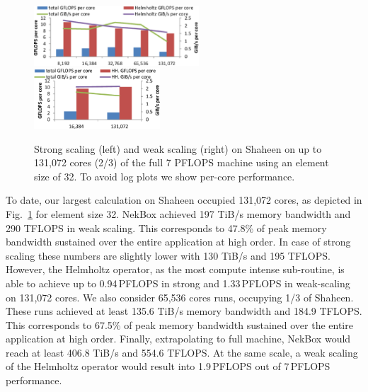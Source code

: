 \begin{figure}[!t]
\centering
\includegraphics[width=0.55\textwidth]{gfx/shaheen_strong}
~
\includegraphics[width=0.42\textwidth]{gfx/shaheen_weak}
\caption{Strong scaling (left) and weak scaling (right) on Shaheen on up to 131,072  cores (2/3) of the full 7 PFLOPS machine using 
an element size of 32.
To avoid log plots we show per-core performance.}
\label{fig:shaheen_scaling}
\end{figure}

To date, our largest calculation on Shaheen occupied 131,072 cores, as depicted in Fig.~\ref{fig:shaheen_scaling}
for element size 32.
NekBox achieved 197 TiB/s memory bandwidth and 290 TFLOPS in weak scaling.
This corresponds to 47.8\% of peak memory bandwidth sustained over the entire application at high order.
In case of strong scaling these numbers are slightly lower with 130 TiB/s and 195 TFLOPS. 
However, the Helmholtz operator, as the most compute intense sub-routine, is able to achieve
up to 0.94\,PFLOPS in strong and 1.33\,PFLOPS
 in weak-scaling on 131,072 cores. %
We also consider 65,536 cores runs, occupying 1/3 of Shaheen.
These runs achieved at least 135.6 TiB/s memory bandwidth and 184.9 TFLOPS.
This corresponds to 67.5\% of peak memory bandwidth sustained over the entire application at high order.
Finally, extrapolating to full machine, NekBox would reach at least 406.8 TiB/s and 554.6 TFLOPS. At the same scale,
a weak scaling of the Helmholtz operator would result into 1.9\,PFLOPS out of 7\,PFLOPS performance.




